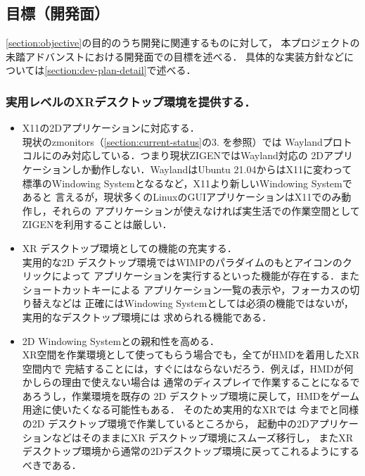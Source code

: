 \subsection{目標（開発面）}
\label{section:dev-goal}

\ref*{section:objective}の目的のうち開発に関連するものに対して，
本プロジェクトの未踏アドバンストにおける開発面での目標を述べる．
具体的な実装方針などについては\ref{section:dev-plan-detail}で述べる．

\subsubsection*{実用レベルのXRデスクトップ環境を提供する．}

\begin{itemize}
  \item X11の2Dアプリケーションに対応する．\\
        現状のzmonitors（\ref{section:current-status}の3. を参照）では %
        Waylandプロトコルにのみ対応している．つまり現状ZIGENではWayland対応の
        2Dアプリケーションしか動作しない．WaylandはUbuntu 21.04からはX11に変わって
        標準のWindowing Systemとなるなど，X11より新しいWindowing Systemであると
        言えるが，現状多くのLinuxのGUIアプリケーションはX11でのみ動作し，それらの
        アプリケーションが使えなければ実生活での作業空間としてZIGENを利用することは厳しい．

  \item XR デスクトップ環境としての機能の充実する．\\
        実用的な2D デスクトップ環境ではWIMPのパラダイムのもとアイコンのクリックによって
        アプリケーションを実行するといった機能が存在する．またショートカットキーによる
        アプリケーション一覧の表示や，フォーカスの切り替えなどは
        正確にはWindowing Systemとしては必須の機能ではないが，実用的なデスクトップ環境には
        求められる機能である．

  \item 2D Windowing Systemとの親和性を高める．\\
        XR空間を作業環境として使ってもらう場合でも，全てがHMDを着用したXR空間内で
        完結することには，すぐにはならないだろう．例えば，HMDが何かしらの理由で使えない場合は
        通常のディスプレイで作業することになるであろうし，作業環境を既存の
        2D デスクトップ環境に戻して，HMDをゲーム用途に使いたくなる可能性もある．
        そのため実用的なXRでは 今までと同様の2D デスクトップ環境で作業しているところから，
        起動中の2DアプリケーションなどはそのままにXR デスクトップ環境にスムーズ移行し，
        またXRデスクトップ環境から通常の2Dデスクトップ環境に戻ってこれるようにするべきである．
\end{itemize}


